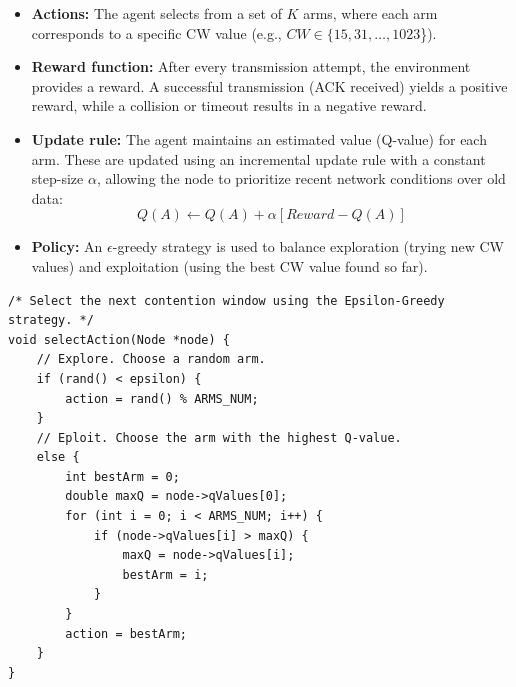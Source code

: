 \begin{itemize}
    \item \textbf{Actions:} The agent selects from a set of $K$ arms, where each arm corresponds to a specific CW value (e.g., $CW\in\{15,31,…,1023$\}).
    
    \item \textbf{Reward function:} After every transmission attempt, the environment provides a reward. A successful transmission (ACK received) yields a positive reward, while a collision or timeout results in a negative reward.

    \item \textbf{Update rule:} The agent maintains an estimated value (Q-value) for each arm. These are updated using an incremental update rule with a constant step-size $\alpha$, allowing the node to prioritize recent network conditions over old data:
    \begin{equation*}
    Q(A)\leftarrow Q(A)+\alpha[Reward-Q(A)]
    \end{equation*}

    \item \textbf{Policy:} An $\epsilon$-greedy strategy is used to balance exploration (trying new CW values) and exploitation (using the best CW value found so 
    far).
\end{itemize}
 
\begin{lstlisting}[style=CStyle]
/* Select the next contention window using the Epsilon-Greedy strategy. */
void selectAction(Node *node) {
    // Explore. Choose a random arm.
    if (rand() < epsilon) {
        action = rand() % ARMS_NUM;
    }
    // Eploit. Choose the arm with the highest Q-value.
    else {
        int bestArm = 0;
        double maxQ = node->qValues[0];
        for (int i = 0; i < ARMS_NUM; i++) {
            if (node->qValues[i] > maxQ) {
                maxQ = node->qValues[i];
                bestArm = i;
            }
        }
        action = bestArm;
    }
}
\end{lstlisting}

